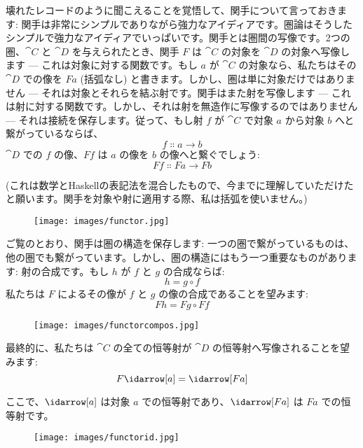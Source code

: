 
\lettrine[lhang=0.17]{壊}{れた}レコードのように聞こえることを覚悟して、関手について言っておきます: 関手は非常にシンプルでありながら強力なアイディアです。圏論はそうしたシンプルで強力なアイディアでいっぱいです。関手とは圏間の写像です。2つの圏、$\cat{C}$ と $\cat{D}$ を与えられたとき、関手 $F$ は $\cat{C}$ の対象を $\cat{D}$ の対象へ写像します --- これは対象に対する関数です。もし $a$ が $\cat{C}$ の対象なら、私たちはその $\cat{D}$ での像を $F a$  (括弧なし) と書きます。しかし、圏は単に対象だけではありません --- それは対象とそれらを結ぶ射です。関手はまた射を写像します --- これは射に対する関数です。しかし、それは射を無造作に写像するのではありません --- それは接続を保存します。従って、もし射 $f$ が $\cat{C}$ で対象 $a$ から対象 $b$ へと繋がっているならば、
\[f \Colon a \to b\]
$\cat{D}$ での $f$ の像、$F f$ は $a$ の像を $b$ の像へと繋ぐでしょう: 
\[F f \Colon F a \to F b\]

 (これは数学とHaskellの表記法を混合したもので、今までに理解していただけたと願います。関手を対象や射に適用する際、私は括弧を使いません。) 

\begin{figure}[H]
  \centering\texttt{[image: images/functor.jpg]}
\end{figure}

\noindent
ご覧のとおり、関手は圏の構造を保存します: 一つの圏で繋がっているものは、他の圏でも繋がっています。しかし、圏の構造にはもう一つ重要なものがあります: 射の合成です。もし $h$ が $f$ と $g$ の合成ならば: 
\[h = g \circ f\]
私たちは $F$ によるその像が $f$ と $g$ の像の合成であることを望みます: 
\[F h = F g \circ F f\]

\begin{figure}[H]
  \centering
  \texttt{[image: images/functorcompos.jpg]}
\end{figure}

\noindent
最終的に、私たちは $\cat{C}$ の全ての恒等射が $\cat{D}$ の恒等射へ写像されることを望みます: 
\[F \idarrow[a] = \idarrow[F a]\]

\noindent
ここで、$\idarrow[a]$ は対象 $a$ での恒等射であり、$\idarrow[F a]$ は $F a$ での恒等射です。

\begin{figure}[H]
  \centering
  \texttt{[image: images/functorid.jpg]}
\end{figure}

